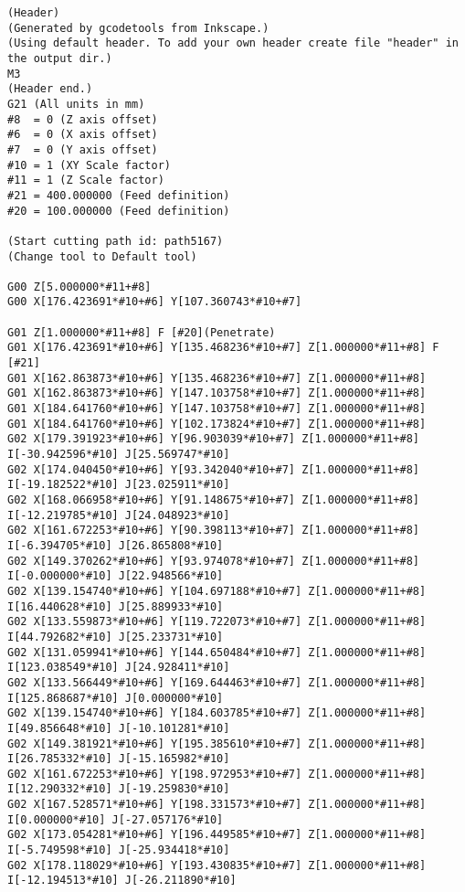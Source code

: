 \begin{lstlisting}[caption={App4-Display full listing for 2D KSG G-Code}, label=App4-Display full listing for 2D KSG G-Code]
%
(Header)
(Generated by gcodetools from Inkscape.)
(Using default header. To add your own header create file "header" in the output dir.)
M3
(Header end.)
G21 (All units in mm)
#8  = 0 (Z axis offset)
#6  = 0 (X axis offset)
#7  = 0 (Y axis offset)
#10 = 1 (XY Scale factor)
#11 = 1 (Z Scale factor)
#21 = 400.000000 (Feed definition)
#20 = 100.000000 (Feed definition)

(Start cutting path id: path5167)
(Change tool to Default tool)

G00 Z[5.000000*#11+#8]
G00 X[176.423691*#10+#6] Y[107.360743*#10+#7]

G01 Z[1.000000*#11+#8] F [#20](Penetrate)
G01 X[176.423691*#10+#6] Y[135.468236*#10+#7] Z[1.000000*#11+#8] F [#21]
G01 X[162.863873*#10+#6] Y[135.468236*#10+#7] Z[1.000000*#11+#8]
G01 X[162.863873*#10+#6] Y[147.103758*#10+#7] Z[1.000000*#11+#8]
G01 X[184.641760*#10+#6] Y[147.103758*#10+#7] Z[1.000000*#11+#8]
G01 X[184.641760*#10+#6] Y[102.173824*#10+#7] Z[1.000000*#11+#8]
G02 X[179.391923*#10+#6] Y[96.903039*#10+#7] Z[1.000000*#11+#8] I[-30.942596*#10] J[25.569747*#10]
G02 X[174.040450*#10+#6] Y[93.342040*#10+#7] Z[1.000000*#11+#8] I[-19.182522*#10] J[23.025911*#10]
G02 X[168.066958*#10+#6] Y[91.148675*#10+#7] Z[1.000000*#11+#8] I[-12.219785*#10] J[24.048923*#10]
G02 X[161.672253*#10+#6] Y[90.398113*#10+#7] Z[1.000000*#11+#8] I[-6.394705*#10] J[26.865808*#10]
G02 X[149.370262*#10+#6] Y[93.974078*#10+#7] Z[1.000000*#11+#8] I[-0.000000*#10] J[22.948566*#10]
G02 X[139.154740*#10+#6] Y[104.697188*#10+#7] Z[1.000000*#11+#8] I[16.440628*#10] J[25.889933*#10]
G02 X[133.559873*#10+#6] Y[119.722073*#10+#7] Z[1.000000*#11+#8] I[44.792682*#10] J[25.233731*#10]
G02 X[131.059941*#10+#6] Y[144.650484*#10+#7] Z[1.000000*#11+#8] I[123.038549*#10] J[24.928411*#10]
G02 X[133.566449*#10+#6] Y[169.644463*#10+#7] Z[1.000000*#11+#8] I[125.868687*#10] J[0.000000*#10]
G02 X[139.154740*#10+#6] Y[184.603785*#10+#7] Z[1.000000*#11+#8] I[49.856648*#10] J[-10.101281*#10]
G02 X[149.381921*#10+#6] Y[195.385610*#10+#7] Z[1.000000*#11+#8] I[26.785332*#10] J[-15.165982*#10]
G02 X[161.672253*#10+#6] Y[198.972953*#10+#7] Z[1.000000*#11+#8] I[12.290332*#10] J[-19.259830*#10]
G02 X[167.528571*#10+#6] Y[198.331573*#10+#7] Z[1.000000*#11+#8] I[0.000000*#10] J[-27.057176*#10]
G02 X[173.054281*#10+#6] Y[196.449585*#10+#7] Z[1.000000*#11+#8] I[-5.749598*#10] J[-25.934418*#10]
G02 X[178.118029*#10+#6] Y[193.430835*#10+#7] Z[1.000000*#11+#8] I[-12.194513*#10] J[-26.211890*#10]

\end{lstlisting}
